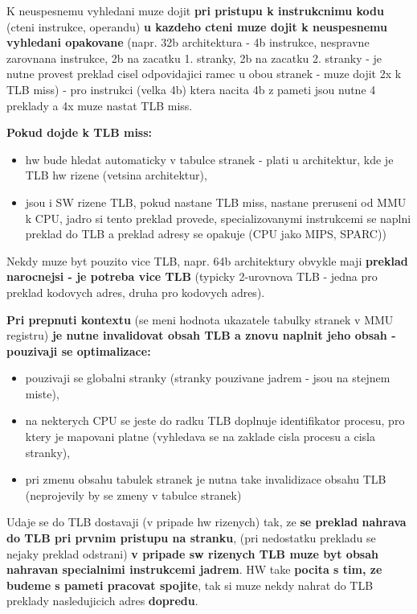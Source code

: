 \documentclass[a4paper, 11pt]{article}
\begin{document}
K neuspesnemu vyhledani muze dojit \textbf{pri pristupu k instrukcnimu kodu} (cteni instrukce, operandu) \textbf{u kazdeho cteni muze dojit k neuspesnemu vyhledani opakovane} (napr. 32b architektura - 4b instrukce, nespravne zarovnana instrukce, 2b na zacatku 1. stranky, 2b na zacatku 2. stranky - je nutne provest preklad cisel odpovidajici ramec u obou stranek - muze dojit 2x k TLB miss) - pro instrukci (velka 4b) ktera nacita 4b z pameti jsou nutne 4 preklady a 4x muze nastat TLB miss.

\textbf{Pokud dojde k TLB miss:}
\begin{itemize}
    \item hw bude hledat automaticky v tabulce stranek - plati u architektur, kde je TLB hw rizene (vetsina architektur),
    \item jsou i SW rizene TLB, pokud nastane TLB miss, nastane preruseni od MMU k CPU, jadro si tento preklad provede, specializovanymi instrukcemi se naplni preklad do TLB a preklad adresy se opakuje (CPU jako MIPS, SPARC)) \\
\end{itemize}

Nekdy muze byt pouzito vice TLB, napr. 64b architektury obvykle maji \textbf{preklad narocnejsi - je potreba vice TLB} (typicky 2-urovnova TLB - jedna pro preklad kodovych adres, druha pro kodovych adres).

\textbf{Pri prepnuti kontextu} (se meni hodnota ukazatele tabulky stranek v MMU registru) \textbf{je nutne invalidovat obsah TLB a znovu naplnit jeho obsah - pouzivaji se optimalizace:}
\begin{itemize}
    \item pouzivaji se globalni stranky (stranky pouzivane jadrem - jsou na stejnem miste),
    \item na nekterych CPU se jeste do radku TLB doplnuje identifikator procesu, pro ktery je mapovani platne (vyhledava se na zaklade cisla procesu a cisla stranky),
    \item pri zmenu obsahu tabulek stranek je nutna take invalidizace obsahu TLB (neprojevily by se zmeny v tabulce stranek) \\
\end{itemize}

Udaje se do TLB dostavaji (v pripade hw rizenych) tak, ze \textbf{se preklad nahrava do TLB pri prvnim pristupu na stranku}, (pri nedostatku prekladu se nejaky preklad odstrani) \textbf{v pripade sw rizenych TLB muze byt obsah nahravan specialnimi instrukcemi jadrem}. HW take \textbf{pocita s tim, ze budeme s pameti pracovat spojite}, tak si muze nekdy nahrat do TLB preklady nasledujicich adres \textbf{dopredu}.
\end{document}
